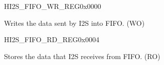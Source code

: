 \begin{register}{H}{I2S\_FIFO\_WR\_REG}{0x0000}\label{regdesc:I2SFIFOWRREG}
%
\begin{regdesc}\begin{reglist}
\item [I2S\_FIFO\_WR\_REG] Writes the data sent by I2S into FIFO. (WO)
\end{reglist}\end{regdesc}
\end{register}

\begin{register}{H}{I2S\_FIFO\_RD\_REG}{0x0004}\label{regdesc:I2SFIFORDREG}
%
\begin{regdesc}\begin{reglist}
\item [I2S\_FIFO\_RD\_REG] Stores the data that I2S receives from FIFO. (RO)
\end{reglist}\end{regdesc}
\end{register}

